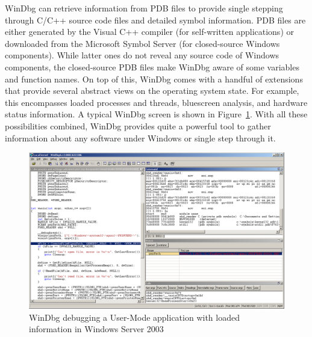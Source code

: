 WinDbg can retrieve information from \gls{PDB} files to provide single stepping through C/C++ source code files and detailed symbol information.
\gls{PDB} files are either generated by the Visual C++ compiler (for self-written applications) or downloaded from the Microsoft Symbol Server (for closed-source Windows components).
While latter ones do not reveal any source code of Windows components, the closed-source \gls{PDB} files make WinDbg aware of some variables and function names.
On top of this, WinDbg comes with a handful of extensions that provide several abstract views on the operating system state.
For example, this encompasses loaded processes and threads, bluescreen analysis, and hardware status information.
A typical WinDbg screen is shown in Figure~\ref{fig:WinDbg}.
With all these possibilities combined, WinDbg provides quite a powerful tool to gather information about any software under Windows or single step through it.


\begin{landscape}
	\begin{figure}
		\centering
		\includegraphics{images/windbg.png}
		\caption{WinDbg debugging a User-Mode application with loaded  information in Windows Server 2003}
		\label{fig:WinDbg}
	\end{figure}
\end{landscape}
